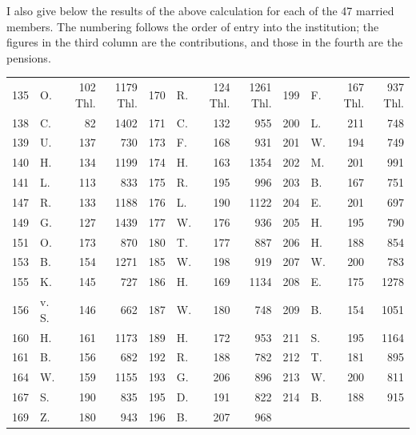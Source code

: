 I also give below the results of the above calculation for each of the 47 married members. The numbering follows the order of entry into the institution; the figures in the third column are the contributions, and those in the fourth are the pensions.

\begin{center}
\footnotesize\setlength{\tabcolsep}{2pt}
\begin{tabular}{r|l|r|r||r|l|r|r||r|l|r|r}
135&O.&102 Thl.&1179 Thl.&170&R.&124 Thl.&1261 Thl.&199&F.&167 Thl.&937 Thl.\\
138&C.&82&1402&171&C.&132&955&200&L.&211&748\\
139&U.&137&730&173&F.&168&931&201&W.&194&749\\
140&H.&134&1199&174&H.&163&1354&202&M.&201&991\\
141&L.&113&833&175&R.&195&996&203&B.&167&751\\
147&R.&133&1188&176&L.&190&1122&204&E.&201&697\\
149&G.&127&1439&177&W.&176&936&205&H.&195&790\\
151&O.&173&870&180&T.&177&887&206&H.&188&854\\
153&B.&154&1271&185&W.&198&919&207&W.&200&783\\
155&K.&145&727&186&H.&169&1134&208&E.&175&1278\\
156&v. S.&146&662&187&W.&180&748&209&B.&154&1051\\
160&H.&161&1173&189&H.&172&953&211&S.&195&1164\\
161&B.&156&682&192&R.&188&782&212&T.&181&895\\
164&W.&159&1155&193&G.&206&896&213&W.&200&811\\
167&S.&190&835&195&D.&191&822&214&B.&188&915\\
169&Z.&180&943&196&B.&207&968&&&&
\end{tabular}
\end{center}

